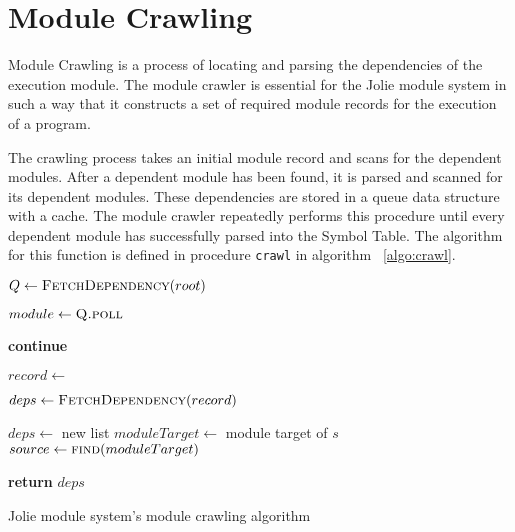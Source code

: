 \section{ Module Crawling }

Module Crawling is a process of locating and parsing the dependencies of the execution module.
The module crawler is essential for the Jolie module system in such a way that it constructs a set of required module records for the execution of a program.

The crawling process takes an initial module record and scans for the dependent modules. After a dependent module has been found, it is parsed and scanned for its dependent modules. These dependencies are stored in a queue data structure with a cache. The module crawler repeatedly performs this procedure until every dependent module has successfully parsed into the Symbol Table. The algorithm for this function is defined in procedure \texttt{crawl} in algorithm ~\ref{algo:crawl}.

\begin{algorithm}
    \begin{algorithmic}[1]



        \State $Q\gets \Call{FetchDependency}{root}$ 
        \State {} 

        \State $module\gets \Call{Q.poll}{}$

        \textbf{continue} 
        \EndIf

        \State $record\gets$  

        \State $deps\gets \Call{FetchDependency}{record}$
        \State {}
        \EndIf
        \EndFor
        \State {} 

        \EndWhile
        \EndProcedure

        \State $deps\gets$ new list
        \State $moduleTarget\gets$ module target of $s$
        \State $source\gets \Call{find}{moduleTarget}$ 

        \State {}
        \EndFor

        \State \textbf{return} $deps$ 
        \EndFunction

    \end{algorithmic}
    \caption{Jolie module system's module crawling algorithm}
    \label{algo:crawl}
\end{algorithm}
\FloatBarrier

